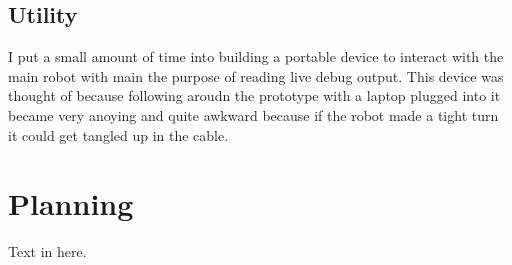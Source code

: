 \documentclass[11pt,fleqn,twoside]{article}
\begin{document}
\subsection{Utility}
I put a small amount of time into building a portable device to interact with the main robot with main the purpose of reading live debug output.  This device was thought of because following aroudn the prototype with a laptop plugged into it became very anoying and quite awkward because if the robot made a tight turn it could get tangled up in the cable.

\section{Planning}
Text in here.


\nocite{*} %

\newpage
{}

%
%

\renewcommand{\refname}{Annotated Bibliography}  %
\end{document}
